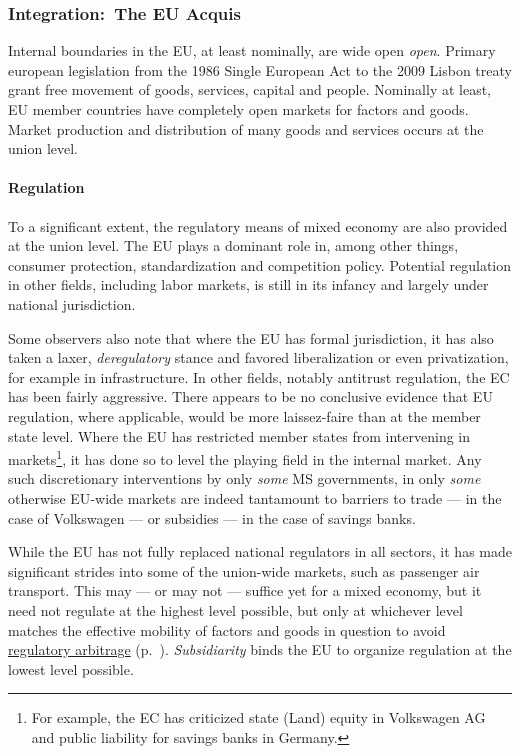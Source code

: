\subsubsection[Integration]{Integration:~The EU Acquis} \label{sec:EU-Acquis}
Internal boundaries in the \gls{EU}, at least nominally, are wide open \emph{open}.
Primary european legislation from the 1986 Single European Act to the 2009 Lisbon treaty grant free movement of goods, services, capital and people.
Nominally at least, \gls{EU} member countries have completely open markets for factors and goods.
Market production and distribution of many goods and services occurs at the union level.

\paragraph{Regulation} To a significant extent, the regulatory means of mixed economy are also provided at the union level.
The \gls{EU} plays a dominant role in, among other things, consumer protection, standardization and competition policy.
Potential regulation in other fields, including labor markets, is still in its infancy and largely under national jurisdiction.

Some observers also note that where the \gls{EU} has formal jurisdiction, it has also taken a laxer, \emph{deregulatory} stance and favored liberalization or even privatization, for example in infrastructure.
In other fields, notably antitrust regulation, the \gls{EC} has been fairly aggressive.
There appears to be no conclusive evidence that \gls{EU} regulation, where applicable, would be more laissez-faire than at the member state level.
Where the \gls{EU} has restricted member states from intervening in markets\footnote{
	For example, the \gls{EC} has criticized state (Land) equity in Volkswagen AG and public liability for savings banks in Germany.},
it has done so to level the playing field in the internal market.
Any such discretionary interventions by only \emph{some} \gls{MS} governments, in only \emph{some} otherwise \gls{EU}-wide markets are indeed tantamount to barriers to trade --- in the case of Volkswagen --- or subsidies --- in the case of savings banks.

While the \gls{EU} has not fully replaced national regulators in all sectors, it has made significant strides into some of the union-wide markets, such as passenger air transport.
This may --- or may not --- suffice yet for a mixed economy, but it need not regulate at the highest level possible, but only at whichever level matches the effective mobility of factors and goods in question to avoid \hyperref[sec:regulatory]{regulatory arbitrage} (p.~\pageref{sec:regulatory}).
\emph{Subsidiarity} binds the \gls{EU} to organize regulation at the lowest level possible.

